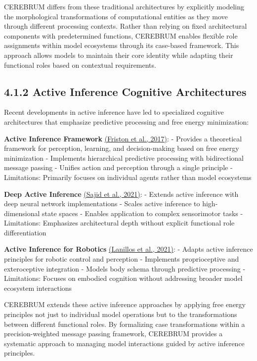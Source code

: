 \documentclass[
  11pt,
  letterpaper,
]{article}
\begin{document}
CEREBRUM differs from these traditional architectures by explicitly
modeling the morphological transformations of computational entities as
they move through different processing contexts. Rather than relying on
fixed architectural components with predetermined functions, CEREBRUM
enables flexible role assignments within model ecosystems through its
case-based framework. This approach allows models to maintain their core
identity while adapting their functional roles based on contextual
requirements.

\hypertarget{active-inference-cognitive-architectures}{%
\subsection{4.1.2 Active Inference Cognitive
Architectures}\label{active-inference-cognitive-architectures}}

Recent developments in active inference have led to specialized
cognitive architectures that emphasize predictive processing and free
energy minimization:

\textbf{Active Inference Framework}
\protect\hyperlink{references}{(Friston et al., 2017)}: - Provides a
theoretical framework for perception, learning, and decision-making
based on free energy minimization - Implements hierarchical predictive
processing with bidirectional message passing - Unifies action and
perception through a single principle - Limitations: Primarily focuses
on individual agents rather than model ecosystems

\textbf{Deep Active Inference} \protect\hyperlink{references}{(Sajid et
al., 2021)}: - Extends active inference with deep neural network
implementations - Scales active inference to high-dimensional state
spaces - Enables application to complex sensorimotor tasks -
Limitations: Emphasizes architectural depth without explicit functional
role differentiation

\textbf{Active Inference for Robotics}
\protect\hyperlink{references}{(Lanillos et al., 2021)}: - Adapts active
inference principles for robotic control and perception - Implements
proprioceptive and exteroceptive integration - Models body schema
through predictive processing - Limitations: Focuses on embodied
cognition without addressing broader model ecosystem interactions

CEREBRUM extends these active inference approaches by applying free
energy principles not just to individual model operations but to the
transformations between different functional roles. By formalizing case
transformations within a precision-weighted message passing framework,
CEREBRUM provides a systematic approach to managing model interactions
guided by active inference principles.
\end{document}
